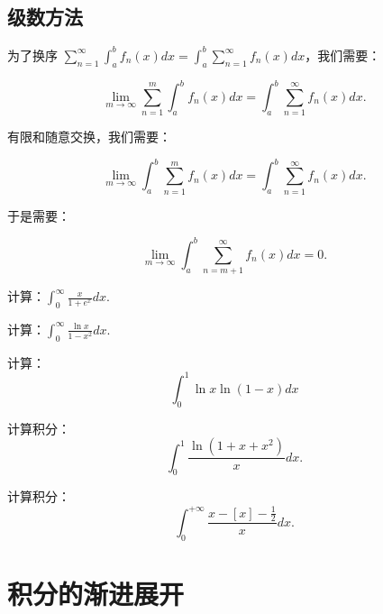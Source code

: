 \documentclass[lang=cn,10pt,thmcnt=section]{elegantbook}
\begin{document}
\subsection{级数方法}
为了换序 \(\sum_{n=1}^{\infty} \int_{a}^{b} f_n(x) dx = \int_{a}^{b} \sum_{n=1}^{\infty} f_n(x) dx\)，我们需要：

\[\lim_{m \to \infty} \sum_{n=1}^{m} \int_{a}^{b} f_n(x) dx = \int_{a}^{b} \sum_{n=1}^{\infty} f_n(x) dx.\]

有限和随意交换，我们需要：

\[\lim_{m \to \infty} \int_{a}^{b} \sum_{n=1}^{m} f_n(x) dx = \int_{a}^{b} \sum_{n=1}^{\infty} f_n(x) dx.\]

于是需要：

\[\lim_{m \to \infty} \int_{a}^{b} \sum_{n=m+1}^{\infty} f_n(x) dx = 0.\]

\begin{example}
计算：\(\int_{0}^{\infty} \frac{x}{1+e^x} dx\).
\end{example}

\begin{example}
计算：\(\int_{0}^{\infty} \frac{\ln x}{1-x^2} dx\).
\end{example}

\begin{example}
计算：  
\[\int_{0}^{1} \ln x \ln (1 - x) dx \]
\end{example}
\begin{example}
	计算积分：\[\int_{0}^{1} \frac{\ln (1 + x + x^2)}{x} dx.\]
\end{example}
\begin{example}
	计算积分：\[\int_{0}^{+\infty} \frac{x - [x] - \frac{1}{2}}{x} dx.\]
\end{example}
\section{积分的渐进展开}
\end{document}
